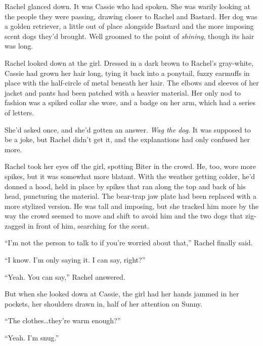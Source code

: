 Rachel glanced down.  It was Cassie who had spoken.  She was warily looking at the people they were passing, drawing closer to Rachel and Bastard.  Her dog was a golden retriever, a little out of place alongside Bastard and the more imposing scent dogs they'd brought.  Well groomed to the point of \emph{shining}, though its hair was long.



Rachel looked down at the girl.  Dressed in a dark brown to Rachel's gray-white, Cassie had grown her hair long, tying it back into a ponytail, fuzzy earmuffs in place with the half-circle of metal beneath her hair.  The elbows and sleeves of her jacket and pants had been patched with a heavier material.  Her only nod to fashion was a spiked collar she wore, and a badge on her arm, which had a series of letters.



She'd asked once, and she'd gotten an answer.  \emph{Wag the dog}.  It was supposed to be a joke, but Rachel didn't get it, and the explanations had only confused her more.



Rachel took her eyes off the girl, spotting Biter in the crowd.  He, too, wore more spikes, but it was somewhat more blatant.  With the weather getting colder, he'd donned a hood, held in place by spikes that ran along the top and back of his head, puncturing the material.  The bear-trap jaw plate had been replaced with a more stylized version.  He was tall and imposing, but she tracked him more by the way the crowd seemed to move and shift to avoid him and the two dogs that zig-zagged in front of him, searching for the scent.



``I'm not the person to talk to if you're worried about that,'' Rachel finally said.



``I know.  I'm only saying it.  I can say, right?''



``Yeah.  You can say,'' Rachel answered.



But when she looked down at Cassie, the girl had her hands jammed in her pockets, her shoulders drawn in, half of her attention on Sunny.



``The clothes\ldots they're warm enough?''



``Yeah.  I'm snug.''



